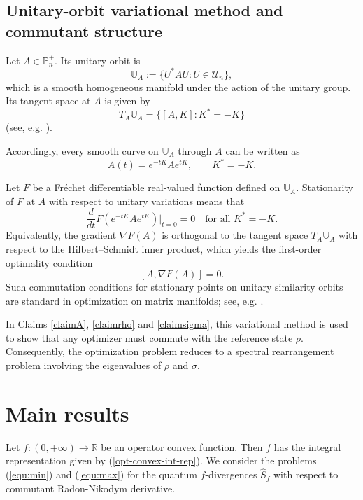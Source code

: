 \documentclass[10pt,reqno]{amsart}
\theoremstyle{break-italic}
\theoremstyle{break-italic}
\theoremstyle{break-italic}
\theoremstyle{break-italic}
\theoremstyle{break-italic}
\theoremstyle{break-italic}
\theoremstyle{break-italic}
\theoremstyle{break-italic}
\theoremstyle{break-roman}
\theoremstyle{standard}
\theoremstyle{varthm-roman}
\theoremstyle{varthm-italic}
\theoremstyle{varthm-roman-break}
\theoremstyle{varthm-italic-break}
\theoremstyle{varthm-roman-no-punctuation}
\theoremstyle{varthm-italic-no-punctuation}
\numberwithin{equation}{section}
\begin{document}
\subsection{Unitary-orbit variational method and commutant structure}


Let $A\in\mathbb P_n^+$. Its unitary orbit is
\[
\mathbb U_A := \{U^*AU : U\in\mathcal U_n\},
\]
which is a smooth homogeneous manifold under the action of the unitary group.
Its tangent space at $A$ is given by
\[
T_A\mathbb U_A=\{[A,K]:K^*=-K\}
\]
(see, e.g. \cite[(VI.37)]{Bh}).

Accordingly, every smooth curve on $\mathbb U_A$ through $A$ can be written as
\[
A(t)=e^{-tK}Ae^{tK}, \qquad K^*=-K .
\]

Let $F$ be a Fr\'echet differentiable real-valued function defined on
$\mathbb U_A$. Stationarity of $F$ at $A$ with respect to unitary variations
means that
\[
\dfrac{d}{dt}F\!\left(e^{-tK}Ae^{tK}\right)\Big\lvert_{t=0}=0
\quad \text{for all } K^*=-K .
\]
Equivalently, the gradient $\nabla F(A)$ is orthogonal to the tangent space
$T_A\mathbb U_A$ with respect to the Hilbert--Schmidt inner product, which yields
the first-order optimality condition
\[
[A,\nabla F(A)]=0.
\]
Such commutation conditions for stationary points on unitary similarity orbits
are standard in optimization on matrix manifolds; see, e.g.
\cite[Theorem VI.4.3]{Bh}.



In Claims \ref{claimA}, \ref{claimrho} and \ref{claimsigma}, this variational method is used to show that any optimizer must commute with the reference state $\rho$. Consequently, the optimization problem reduces to a spectral rearrangement problem involving the eigenvalues of $\rho$ and $\sigma$.


\section{Main results}\label{sec:mainresults}
Let $f : (0, +\infty) \rightarrow \mathbb R$ be an operator  convex function. Then $f$ has the integral representation given by (\ref{opt-convex-int-rep}). We consider the problems (\ref{equ:min}) and (\ref{equ:max}) for the quantum $f$-divergences $\widehat{S}_f$ with respect to commutant Radon-Nikodym derivative.
\end{document}
